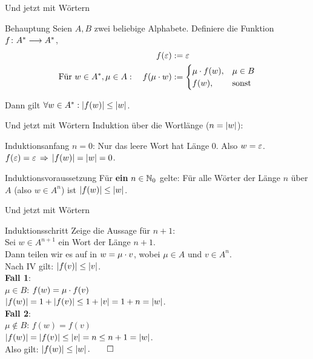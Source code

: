 \begin{frame}{Und jetzt mit Wörtern}
	\begin{block}{Behauptung}
		Seien $A, B$ zwei beliebige Alphabete. Definiere die Funktion $f \colon A^* \longrightarrow A^*$,
		\begin{align*}
			f(\varepsilon) &:= \varepsilon \\
			\text{Für } w \in A^*, \mu \in A: \quad f(\mu \cdot w) &:= 
			\begin{cases}
				\mu \cdot f(w), &\mu \in B \\
				f(w), &\text{sonst}
			\end{cases}\\
		\end{align*}
	
	Dann gilt $\forall w \in A^*: \left\lvert f(w) \right\rvert \le \left\lvert w \right\rvert$.
	\end{block}
\end{frame}

\begin{frame}{Und jetzt mit Wörtern}
	Induktion über die Wortlänge ($n = \left\lvert w \right\rvert$):\\[0.5em]
	\pause
	\begin{block}{Induktionsanfang}
		$n = 0$: Nur das leere Wort hat Länge 0. Also $w = \varepsilon$.\\
		$f(\eps) = \eps \impl \size{f(w)} = \size w = 0$. \; \textbf{\checked}
	\end{block}
	\pause
	\begin{block}{Induktionsvoraussetzung}
		Für \textbf{ein} $n \in \mathbb{N}_0$ gelte: Für alle Wörter der Länge $n$ über $A$ (also $w \in A^n$) ist $\left\lvert f(w) \right\rvert \le \left\lvert w \right\rvert$.
	\end{block}
\end{frame}

\begin{frame}{Und jetzt mit Wörtern}
	\begin{block}{Induktionsschritt}
		Zeige die Aussage für $n+1$:\\
		Sei $w \in A^{n+1}$ ein Wort der Länge $n+1$.\\
		\pause
		Dann teilen wir es auf in $w = \mu \cdot v$, wobei $\mu \in A$ und $v \in A^n$.\\
		Nach IV gilt: $\left\lvert f(v) \right\rvert \le \left\lvert v \right\rvert$.\\
		\pause
		\smallskip
		\textbf{Fall 1}: \\
			\quad $\mu \in B$: $f(w) = \mu \cdot f(v)$ \\
			\quad \impl $\left\lvert f(w) \right\rvert = 1 + \left\lvert f(v) \right\rvert \le 1 + \left\lvert v \right\rvert = 1+n = \left\lvert w \right\rvert$.\\
		\pause
		\smallskip
		\textbf{Fall 2}: \\
			\quad $\mu \notin B$: $f(w) = f(v)$ \\
			\quad \impl $\left\lvert f(w) \right\rvert = \left\lvert f(v) \right\rvert \le \left\lvert v \right\rvert = n \le n+1 = \left\lvert w \right\rvert$.\\
		\pause
		\smallskip
		Also gilt: $\left\lvert f(w) \right\rvert \le \left\lvert w \right\rvert. \qed$
	\end{block}
\end{frame}